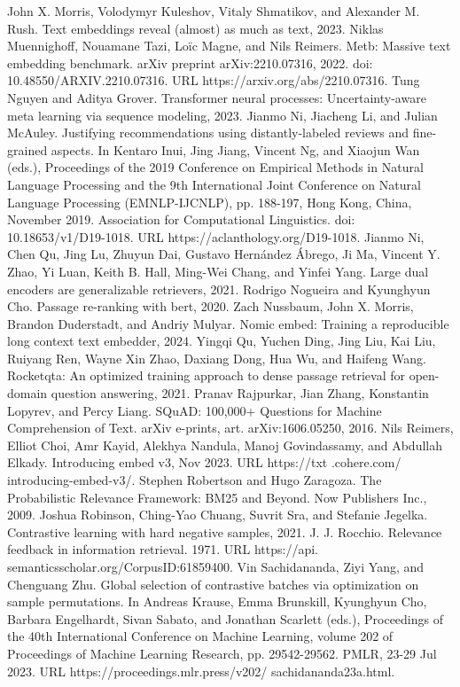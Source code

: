 John X. Morris, Volodymyr Kuleshov, Vitaly Shmatikov, and Alexander M. Rush. Text embeddings reveal (almost) as much as text, 2023.
Niklas Muennighoff, Nouamane Tazi, Loïc Magne, and Nils Reimers. Metb: Massive text embedding benchmark. arXiv preprint arXiv:2210.07316, 2022. doi: 10.48550/ARXIV.2210.07316. URL https://arxiv.org/abs/2210.07316.
Tung Nguyen and Aditya Grover. Transformer neural processes: Uncertainty-aware meta learning via sequence modeling, 2023.
Jianmo Ni, Jiacheng Li, and Julian McAuley. Justifying recommendations using distantly-labeled reviews and fine-grained aspects. In Kentaro Inui, Jing Jiang, Vincent Ng, and Xiaojun Wan (eds.), Proceedings of the 2019 Conference on Empirical Methods in Natural Language Processing and the 9th International Joint Conference on Natural Language Processing (EMNLP-IJCNLP), pp. 188-197, Hong Kong, China, November 2019. Association for Computational Linguistics. doi: 10.18653/v1/D19-1018. URL https://aclanthology.org/D19-1018.
Jianmo Ni, Chen Qu, Jing Lu, Zhuyun Dai, Gustavo Hernández Ábrego, Ji Ma, Vincent Y. Zhao, Yi Luan, Keith B. Hall, Ming-Wei Chang, and Yinfei Yang. Large dual encoders are generalizable retrievers, 2021.
Rodrigo Nogueira and Kyunghyun Cho. Passage re-ranking with bert, 2020.
Zach Nussbaum, John X. Morris, Brandon Duderstadt, and Andriy Mulyar. Nomic embed: Training a reproducible long context text embedder, 2024.
Yingqi Qu, Yuchen Ding, Jing Liu, Kai Liu, Ruiyang Ren, Wayne Xin Zhao, Daxiang Dong, Hua Wu, and Haifeng Wang. Rocketqta: An optimized training approach to dense passage retrieval for open-domain question answering, 2021.
Pranav Rajpurkar, Jian Zhang, Konstantin Lopyrev, and Percy Liang. SQuAD: 100,000+ Questions for Machine Comprehension of Text. arXiv e-prints, art. arXiv:1606.05250, 2016.
Nils Reimers, Elliot Choi, Amr Kayid, Alekhya Nandula, Manoj Govindassamy, and Abdullah Elkady. Introducing embed v3, Nov 2023. URL https://txt .cohere.com/ introducing-embed-v3/.
Stephen Robertson and Hugo Zaragoza. The Probabilistic Relevance Framework: BM25 and Beyond. Now Publishers Inc., 2009.
Joshua Robinson, Ching-Yao Chuang, Suvrit Sra, and Stefanie Jegelka. Contrastive learning with hard negative samples, 2021.
J. J. Rocchio. Relevance feedback in information retrieval. 1971. URL https://api. semanticsscholar.org/CorpusID:61859400.
Vin Sachidananda, Ziyi Yang, and Chenguang Zhu. Global selection of contrastive batches via optimization on sample permutations. In Andreas Krause, Emma Brunskill, Kyunghyun Cho, Barbara Engelhardt, Sivan Sabato, and Jonathan Scarlett (eds.), Proceedings of the 40th International Conference on Machine Learning, volume 202 of Proceedings of Machine Learning Research, pp. 29542-29562. PMLR, 23-29 Jul 2023. URL https://proceedings.mlr.press/v202/ sachidananda23a.html.

